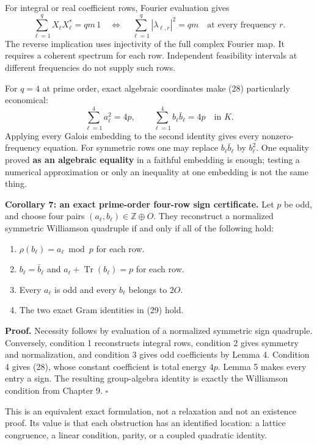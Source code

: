 \documentclass[
  11pt,
]{article}
\providecommand{\tightlist}{%
  \setlength{\itemsep}{0pt}\setlength{\parskip}{0pt}}
\begin{document}
For integral or real coefficient rows, Fourier evaluation gives \[
 \sum_{\ell=1}^{q}X_\ell X_\ell^*=qm\,1
 \quad\Longleftrightarrow\quad
 \sum_{\ell=1}^{q}|\lambda_{\ell,r}|^2=qm
       \quad\text{at every frequency }r.                 \tag{28}
\] The reverse implication uses injectivity of the full complex Fourier
map. It requires a coherent spectrum for each row. Independent
feasibility intervals at different frequencies do not supply such rows.

For \(q=4\) at prime order, exact algebraic coordinates make (28)
particularly economical: \[
 \sum_{\ell=1}^4a_\ell^2=4p,\qquad
 \sum_{\ell=1}^4b_\ell\bar b_\ell=4p
                    \quad\text{in }K.                   \tag{29}
\] Applying every Galois embedding to the second identity gives every
nonzero-frequency equation. For symmetric rows one may replace
\(b_\ell\bar b_\ell\) by \(b_\ell^2\). One equality proved \textbf{as an
algebraic equality} in a faithful embedding is enough; testing a
numerical approximation or only an inequality at one embedding is not
the same thing.

\textbf{Corollary 7: an exact prime-order four-row sign certificate.}
Let \(p\) be odd, and choose four pairs
\((a_\ell,b_\ell)\in\mathbb Z\oplus O\). They reconstruct a normalized
symmetric Williamson quadruple if and only if all of the following hold:

\begin{enumerate}
\def\labelenumi{\arabic{enumi}.}
\tightlist
\item
  \(\rho(b_\ell)=a_\ell\bmod p\) for each row.
\item
  \(b_\ell=\bar b_\ell\) and \(a_\ell+\operatorname{Tr}(b_\ell)=p\) for
  each row.
\item
  Every \(a_\ell\) is odd and every \(b_\ell\) belongs to \(2O\).
\item
  The two exact Gram identities in (29) hold.
\end{enumerate}

\textbf{Proof.} Necessity follows by evaluation of a normalized
symmetric sign quadruple. Conversely, condition 1 reconstructs integral
rows, condition 2 gives symmetry and normalization, and condition 3
gives odd coefficients by Lemma 4. Condition 4 gives (28), whose
constant coefficient is total energy \(4p\). Lemma 5 makes every entry a
sign. The resulting group-algebra identity is exactly the Williamson
condition from Chapter 9. \(\square\)

This is an equivalent exact formulation, not a relaxation and not an
existence proof. Its value is that each obstruction has an identified
location: a lattice congruence, a linear condition, parity, or a coupled
quadratic identity.
\end{document}
